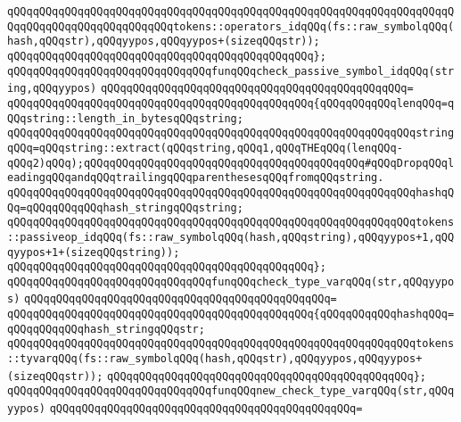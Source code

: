 \verb|qQQqqQQqqQQqqQQqqQQqqQQqqQQqqQQqqQQqqQQqqQQqqQQqqQQqqQQqqQQqqQQqqQQqqQQqqQQqqQQqqQQqqQQqqQQqqQQqtokens::operators_idqQQq(fs::raw_symbolqQQq(hash,qQQqstr),qQQqyypos,qQQqyypos+(sizeqQQqstr));|\newline
\verb|qQQqqQQqqQQqqQQqqQQqqQQqqQQqqQQqqQQqqQQqqQQqqQQq};|\newline
\newline
\verb|qQQqqQQqqQQqqQQqqQQqqQQqqQQqqQQqfunqQQqcheck_passive_symbol_idqQQq(string,qQQqyypos)|\newline
\verb|qQQqqQQqqQQqqQQqqQQqqQQqqQQqqQQqqQQqqQQqqQQqqQQq=|\newline
\verb|qQQqqQQqqQQqqQQqqQQqqQQqqQQqqQQqqQQqqQQqqQQqqQQq{qQQqqQQqqQQqlenqQQq=qQQqstring::length_in_bytesqQQqstring;|\newline
\verb|qQQqqQQqqQQqqQQqqQQqqQQqqQQqqQQqqQQqqQQqqQQqqQQqqQQqqQQqqQQqqQQqstringqQQq=qQQqstring::extract(qQQqstring,qQQq1,qQQqTHEqQQq(lenqQQq-qQQq2)qQQq);qQQqqQQqqQQqqQQqqQQqqQQqqQQqqQQqqQQqqQQqqQQq#qQQqDropqQQqleadingqQQqandqQQqtrailingqQQqparenthesesqQQqfromqQQqstring.|\newline
\verb|qQQqqQQqqQQqqQQqqQQqqQQqqQQqqQQqqQQqqQQqqQQqqQQqqQQqqQQqqQQqqQQqhashqQQq=qQQqqQQqqQQqhash_stringqQQqstring;|\newline
\verb|qQQqqQQqqQQqqQQqqQQqqQQqqQQqqQQqqQQqqQQqqQQqqQQqqQQqqQQqqQQqqQQqtokens::passiveop_idqQQq(fs::raw_symbolqQQq(hash,qQQqstring),qQQqyypos+1,qQQqyypos+1+(sizeqQQqstring));|\newline
\verb|qQQqqQQqqQQqqQQqqQQqqQQqqQQqqQQqqQQqqQQqqQQqqQQq};|\newline
\newline
\verb|qQQqqQQqqQQqqQQqqQQqqQQqqQQqqQQqfunqQQqcheck_type_varqQQq(str,qQQqyypos)|\newline
\verb|qQQqqQQqqQQqqQQqqQQqqQQqqQQqqQQqqQQqqQQqqQQqqQQq=|\newline
\verb|qQQqqQQqqQQqqQQqqQQqqQQqqQQqqQQqqQQqqQQqqQQqqQQq{qQQqqQQqqQQqhashqQQq=qQQqqQQqqQQqhash_stringqQQqstr;|\newline
\newline
\verb|qQQqqQQqqQQqqQQqqQQqqQQqqQQqqQQqqQQqqQQqqQQqqQQqqQQqqQQqqQQqqQQqtokens::tyvarqQQq(fs::raw_symbolqQQq(hash,qQQqstr),qQQqyypos,qQQqyypos+(sizeqQQqstr));|\newline
\verb|qQQqqQQqqQQqqQQqqQQqqQQqqQQqqQQqqQQqqQQqqQQqqQQq};|\newline
\newline
\verb|qQQqqQQqqQQqqQQqqQQqqQQqqQQqqQQqfunqQQqnew_check_type_varqQQq(str,qQQqyypos)|\newline
\verb|qQQqqQQqqQQqqQQqqQQqqQQqqQQqqQQqqQQqqQQqqQQqqQQq=|\newline

